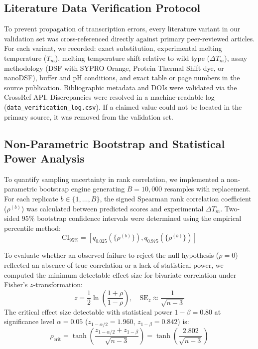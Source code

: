 \documentclass[11pt,a4paper]{article}
\begin{document}
\subsection{Literature Data Verification Protocol}
To prevent propagation of transcription errors, every literature variant in our validation set was cross-referenced directly against primary peer-reviewed articles. For each variant, we recorded: exact substitution, experimental melting temperature ($T_m$), melting temperature shift relative to wild type ($\Delta T_m$), assay methodology (DSF with SYPRO Orange, Protein Thermal Shift dye, or nanoDSF), buffer and pH conditions, and exact table or page numbers in the source publication. Bibliographic metadata and DOIs were validated via the CrossRef API. Discrepancies were resolved in a machine-readable log (\texttt{data\_verification\_log.csv}). If a claimed value could not be located in the primary source, it was removed from the validation set.

\subsection{Non-Parametric Bootstrap and Statistical Power Analysis}
To quantify sampling uncertainty in rank correlation, we implemented a non-parametric bootstrap engine generating $B = 10,000$ resamples with replacement. For each replicate $b \in \{1, \dots, B\}$, the signed Spearman rank correlation coefficient ($\rho^{(b)}$) was calculated between predicted scores and experimental $\Delta T_m$. Two-sided $95\%$ bootstrap confidence intervals were determined using the empirical percentile method:
\begin{equation}
    \text{CI}_{95\%} = \left[ q_{0.025}\left(\{\rho^{(b)}\}\right), q_{0.975}\left(\{\rho^{(b)}\}\right) \right]
\end{equation}

To evaluate whether an observed failure to reject the null hypothesis ($\rho = 0$) reflected an absence of true correlation or a lack of statistical power, we computed the minimum detectable effect size for bivariate correlation under Fisher's $z$-transformation:
\begin{equation}
    z = \frac{1}{2}\ln\left(\frac{1 + \rho}{1 - \rho}\right), \quad \text{SE}_z \approx \frac{1}{\sqrt{n - 3}}
\end{equation}
The critical effect size detectable with statistical power $1 - \beta = 0.80$ at significance level $\alpha = 0.05$ ($z_{1 - \alpha/2} = 1.960$, $z_{1 - \beta} = 0.842$) is:
\begin{equation}
    \rho_{\text{crit}} = \tanh\left(\frac{z_{1 - \alpha/2} + z_{1 - \beta}}{\sqrt{n - 3}}\right) = \tanh\left(\frac{2.802}{\sqrt{n - 3}}\right)
\end{equation}
\end{document}
